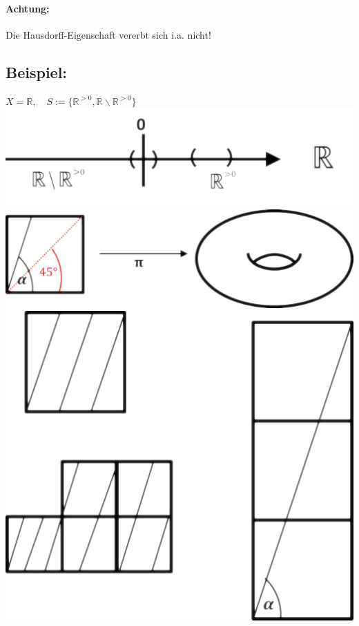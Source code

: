 \documentclass[a4paper,11pt,notitlepage]{report}
\theoremstyle{definition}
\newcommand{\R}{{\ensuremath{\mathbb{R}}}}
\newenvironment{bsp}[1]
{
\setlength{\fboxsep}{10pt}
\subsection*{Beispiel: #1}
\begin{upshape}
}
{
\end{upshape}
}
\begin{document}
\paragraph{Achtung:}
Die Hausdorff-Eigenschaft vererbt sich i.a. nicht!

\begin{bsp}{}
	$X = \R, \quad S:= \{\R^{>0}, \R \backslash \R^{>0}\}$\newline
	\includegraphics[scale=0.6]{images/Partition_R.png}\newline
	\includegraphics[scale=0.6]{images/Identifizierung_Linien.png}\newline
	\includegraphics[scale=0.6]{images/Linien_Quadrat.png}\newline


\end{bsp}
\end{document}
